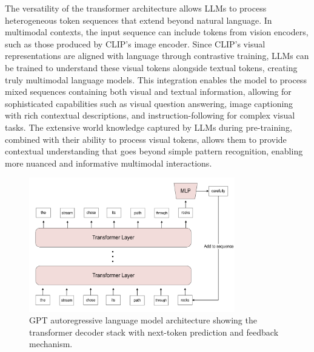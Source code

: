 The versatility of the transformer architecture allows LLMs to process heterogeneous token sequences that extend beyond natural language. In multimodal contexts, the input sequence can include tokens from vision encoders, such as those produced by CLIP's image encoder. Since CLIP's visual representations are aligned with language through contrastive training, LLMs can be trained to understand these visual tokens alongside textual tokens, creating truly multimodal language models. This integration enables the model to process mixed sequences containing both visual and textual information, allowing for sophisticated capabilities such as visual question answering, image captioning with rich contextual descriptions, and instruction-following for complex visual tasks. The extensive world knowledge captured by LLMs during pre-training, combined with their ability to process visual tokens, allows them to provide contextual understanding that goes beyond simple pattern recognition, enabling more nuanced and informative multimodal interactions.

\begin{figure}[htbp]
\centering
\includegraphics[width=0.8\textwidth]{Images/gpt.png}
\caption{GPT autoregressive language model architecture showing the transformer decoder stack with next-token prediction and feedback mechanism.}
\label{fig:gpt}
\end{figure}